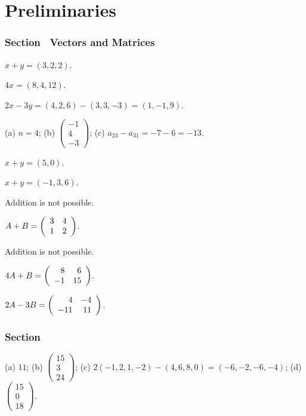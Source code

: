 \setcounter{chapter}{0}

\chapter{Preliminaries}

\subsection*{Section~\protect{\ref{S:1.1}} Vectors and Matrices}

 $ x + y = (3,2,2)$.

 $4x = (8,4,12)$.

 $2x - 3y = (4,2,6) - (3,3,-3) = (1,-1,9)$.

(a) $n = 4$;
(b) $\left(\begin{array}{r} -1 \\ 4 \\ -3 \end{array} \right)$;
(c) $a_{23}-a_{31} =  -7 - 6 = -13$.

 $x + y = (5,0)$.

 $x + y = (-1,3,6)$.

 Addition is not possible.

 $A + B = \left(\begin{array}{rr} 3 & 4\\ 1 &2\end{array}\right)$.

 Addition is not possible.

 $4A + B = \left(\begin{array}{rr} 8 & 6\\ -1 &15\end{array}\right)$.

\newpage
{} $2A - 3B = \left(\begin{array}{rr} 4 & -4\\ -11 &11\end{array}\right)$.



\subsection*{Section~\protect{\ref{S:1.2}} \protect{\Matlab}}

(a) $11$;
(b) $\left(\begin{array}{r} 15\\ 3 \\24\end{array} \right)$;
(c) $2(-1,2, 1,-2)- (4, 6, 8, 0)=(-6,-2,-6,-4)$;
(d) $\left(\begin{array}{r} 15 \\ 0 \\ 18 \end{array} \right)$.

